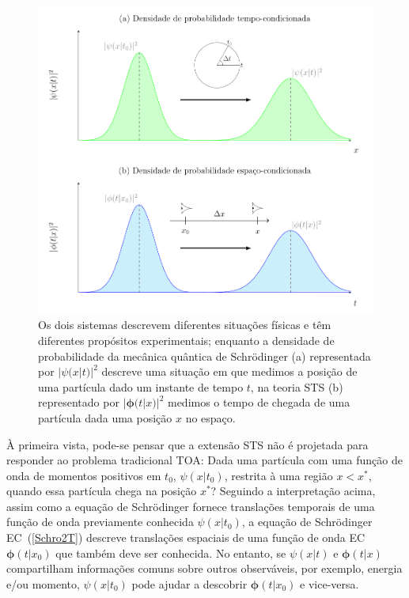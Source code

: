 \begin{figure}[H]
    \centering
    \includegraphics[width=15cm]{anexos/final_sketch_pt.pdf}
    \caption{Os dois sistemas descrevem diferentes situações físicas e têm diferentes propósitos experimentais; enquanto a densidade de probabilidade da mecânica quântica de Schrödinger (a) representada por $|\psi(x|t)|^2$ descreve uma situação em que medimos a posição de uma partícula dado um instante de tempo $t$, na teoria STS (b) representado por $|\pmb{\phi}(t|x)|^2$ medimos o tempo de chegada de uma partícula dada uma posição $x$ no espaço.}
    \label{fig:timevsspace}
\end{figure}


À primeira vista, pode-se pensar que a extensão STS não é projetada para responder ao problema tradicional TOA: Dada uma partícula com uma função de onda de momentos positivos em $t_0$, $\psi(x|t_0)$, restrita à uma região $x<x^* $, quando essa partícula chega na posição $x^*$? Seguindo a interpretação acima, assim como a equação de Schrödinger fornece translações temporais de uma função de onda previamente conhecida $\psi(x|t_0)$, a equação de Schrödinger EC~(\ref{Schro2T}) descreve translações espaciais de uma função de onda EC $\pmb{\phi}(t|x_0)$ que também deve ser conhecida. No entanto, se $\psi(x|t)$ e $\pmb{\phi}(t|x)$ compartilham informações comuns sobre outros observáveis, por exemplo, energia e/ou momento, $\psi(x|t_0)$ pode ajudar a descobrir $\pmb{\phi}(t|x_0)$ e vice-versa.

